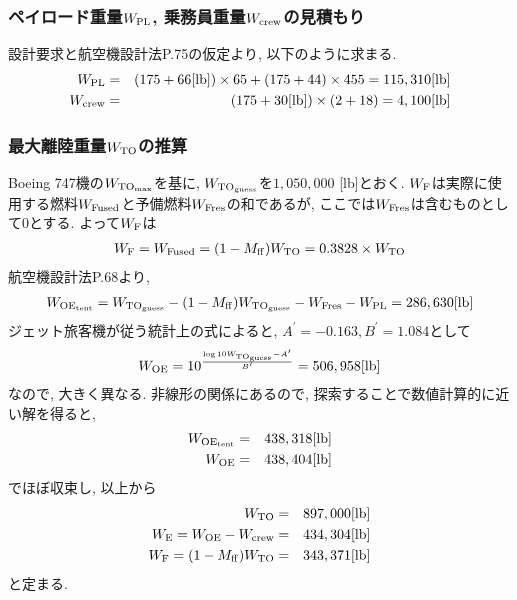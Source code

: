 \documentclass[12pt]{jsarticle}
\begin{document}
\subsubsection{ペイロード重量$W_{\rm PL}$, 乗務員重量$W_{\rm crew}$の見積もり}
設計要求と航空機設計法P.75の仮定より, 以下のように求まる.
\begin{eqnarray*}
	W_{\rm PL} &=& (175 + 66 [\rm lb]) \times 65 + (175 + 44) \times 455 = 115,310 [\rm lb] \\
	W_{\rm crew} &=& (175 + 30 [\rm lb]) \times (2 + 18) = 4,100 [\rm lb] \\
\end{eqnarray*}

\subsubsection{最大離陸重量$W_{\rm TO}$の推算}
Boeing 747機の$W_{\rm TO_{max}}$を基に, $W_{\rm {TO}_{guess}}$を$1,050,000$ [lb]とおく. $W_{\rm F}$は実際に使用する燃料$W_{\rm Fused}$と予備燃料$W_{\rm Fres}$の和であるが, ここでは$W_{\rm Fres}$は含むものとして0とする. よって$W_{\rm F}$は
\begin{eqnarray*}
	W_{\rm F} = W_{\rm Fused} = (1 - M_{\rm ff}) W_{\rm TO} = 0.3828 \times W_{\rm TO}
\end{eqnarray*}
航空機設計法P.68より, 
\begin{eqnarray*}
	W_{\rm OE_{tent}} = W_{\rm TO_{guess}} - (1 - M_{\rm ff})W_{\rm TO_{guess}} - W_{\rm Fres} - W_{\rm PL} = 286,630 [\rm lb]
\end{eqnarray*}
ジェット旅客機が従う統計上の式によると, $A^{\prime}=-0.163, B^{\prime}=1.084$として
\begin{eqnarray*}
	W_{\rm OE} = 10^{\frac{\log{10}W_{\rm TO_{guess}} - A^{\prime}}{B^{\prime}}} = 506,958 [\rm lb]
\end{eqnarray*}
なので, 大きく異なる. 非線形の関係にあるので, 探索することで数値計算的に近い解を得ると,
\begin{eqnarray*}
	W_{\rm OE_{tent}} &=& 438,318 [\rm lb] \\
	W_{\rm OE} &=& 438,404 [\rm lb]
\end{eqnarray*}
でほぼ収束し, 以上から
\begin{eqnarray*}
	W_{\rm TO} &=& 897,000 [\rm lb] \\
	W_{\rm E} = W_{\rm OE} - W_{\rm crew} &=& 434,304 [\rm lb] \\
	W_{\rm F} = (1 - M_{\rm ff})W_{\rm TO} &=& 343,371 [\rm lb]
\end{eqnarray*}
と定まる.
\end{document}
